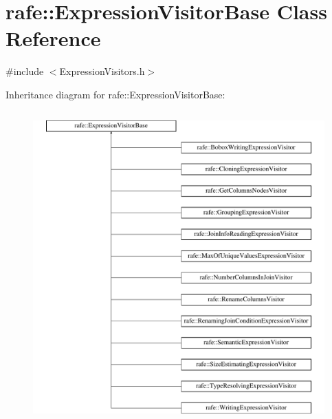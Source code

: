 \hypertarget{classrafe_1_1_expression_visitor_base}{\section{rafe\+:\+:Expression\+Visitor\+Base Class Reference}
\label{classrafe_1_1_expression_visitor_base}
}


{\ttfamily \#include $<$Expression\+Visitors.\+h$>$}

Inheritance diagram for rafe\+:\+:Expression\+Visitor\+Base\+:\begin{figure}[H]
\begin{center}
\leavevmode
\includegraphics[height=12.000000cm]{classrafe_1_1_expression_visitor_base}
\end{center}
\end{figure}
